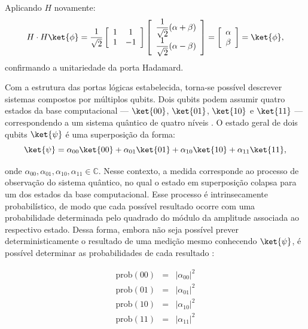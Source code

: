 Aplicando $H$ novamente:
    $$
        H\cdot H\ket{\phi}= \dfrac{1}{\sqrt{2}}\left[\begin{array}{cc}
             1 & 1 \\
             1 & -1 
        \end{array}\right]\left[\begin{array}{c}
             \dfrac{1}{\sqrt{2}}(\alpha+\beta) \\
             \dfrac{1}{\sqrt{2}}(\alpha - \beta)
        \end{array}\right] = \left[\begin{array}{c}
             \alpha \\
             \beta 
        \end{array}\right]=\ket{\phi},
    $$
confirmando a unitariedade da porta Hadamard.

Com a estrutura das portas lógicas estabelecida, torna-se possível descrever sistemas compostos por múltiplos qubits. Dois qubits podem assumir quatro estados da base computacional — $\ket{00}$, $\ket{01}$, $\ket{10}$ e $\ket{11}$ — correspondendo a um sistema quântico de quatro níveis \cite{Amaral2011MecanicaFormacao}. O estado geral de dois qubits $\ket{\psi}$ é uma superposição da forma:
    $$
        \ket{\psi}=\alpha_{00}\ket{00}+\alpha_{01}\ket{01}+\alpha_{10}
        \ket{10}+\alpha_{11}\ket{11},
    $$

\noindent onde $\alpha_{00}, \alpha_{01}, \alpha_{10}, \alpha_{11}\in\mathbb{C}$. Nesse contexto, a medida corresponde ao processo de observação do sistema quântico, no qual o estado em superposição colapsa para um dos estados da base computacional. Esse processo é intrinsecamente probabilístico, de modo que cada possível resultado ocorre com uma probabilidade determinada pelo quadrado do módulo da amplitude associada ao respectivo estado. Dessa forma, embora não seja possível prever deterministicamente o resultado de uma medição mesmo conhecendo $\ket{\psi}$, é possível determinar as probabilidades de cada 
resultado \cite{griffiths2018introduction, Marquezino2019}:

    $$
        \begin{array}{lcl}
             \text{prob}(00) & = &|\alpha_{00}|^2 \\
             \text{prob}(01) & = &|\alpha_{01}|^2 \\
             \text{prob}(10) & = &|\alpha_{10}|^2 \\
             \text{prob}(11) & = &|\alpha_{11}|^2 \\
        \end{array} 
    $$

